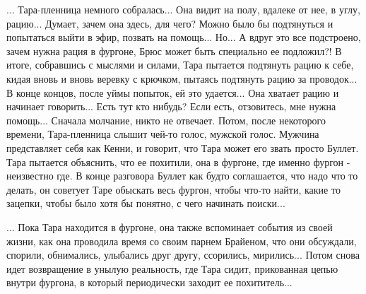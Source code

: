 ... Тара-пленница немного собралась... Она видит на полу, вдалеке от нее, в
углу, рацию... Думает, зачем она здесь, для чего? Можно было бы подтянуться и
попытаться выйти в эфир, позвать на помощь... Но... А вдруг это все подстроено,
зачем нужна рация в фургоне, Брюс может быть специально ее подложил?! В итоге,
собравшись с мыслями и силами, Тара пытается подтянуть рацию к себе, кидая
вновь и вновь веревку с крючком, пытаясь подтянуть рацию за проводок... В конце
концов, после уймы попыток, ей это удается... Она хватает рацию и начинает
говорить... Есть тут кто нибудь? Если есть, отзовитесь, мне нужна помощь...
Сначала молчание, никто не отвечает.  Потом, после некоторого времени,
Тара-пленница слышит чей-то голос, мужской голос. Мужчина представляет себя как
Кенни, и говорит, что Тара может его звать просто Буллет. Тара пытается
объяснить, что ее похитили, она в фургоне, где именно фургон - неизвестно где.
В конце разговора Буллет как будто соглашается, что надо что то делать, он
советует Таре обыскать весь фургон, чтобы что-то найти, какие то зацепки, чтобы
было хотя бы понятно, с чего начинать поиски...

... Пока Тара находится в фургоне, она также вспоминает события из своей жизни,
как она проводила время со своим парнем Брайеном, что они обсуждали, спорили,
обнимались, улыбались друг другу, ссорились, мирились... Потом снова идет
возвращение в унылую реальность, где Тара сидит, прикованная цепью внутри
фургона, в который периодически заходит ее похититель...
